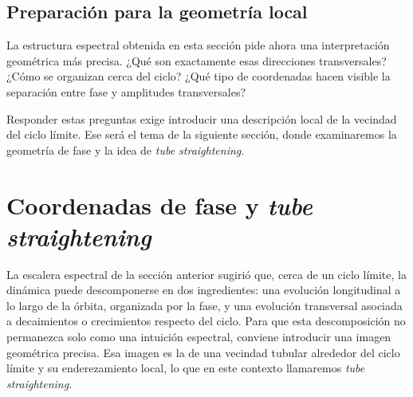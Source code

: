 \subsection{Preparación para la geometría local}

La estructura espectral obtenida en esta sección pide ahora una interpretación geométrica más precisa. ¿Qué son exactamente esas direcciones transversales? ¿Cómo se organizan cerca del ciclo? ¿Qué tipo de coordenadas hacen visible la separación entre fase y amplitudes transversales?

Responder estas preguntas exige introducir una descripción local de la vecindad del ciclo límite. Ese será el tema de la siguiente sección, donde examinaremos la geometría de fase y la idea de \emph{tube straightening}.
\section{Coordenadas de fase y \emph{tube straightening}}

La escalera espectral de la sección anterior sugirió que, cerca de un ciclo límite, la dinámica puede descomponerse en dos ingredientes: una evolución longitudinal a lo largo de la órbita, organizada por la fase, y una evolución transversal asociada a decaimientos o crecimientos respecto del ciclo. Para que esta descomposición no permanezca solo como una intuición espectral, conviene introducir una imagen geométrica precisa. Esa imagen es la de una vecindad tubular alrededor del ciclo límite y su enderezamiento local, lo que en este contexto llamaremos \emph{tube straightening}.

